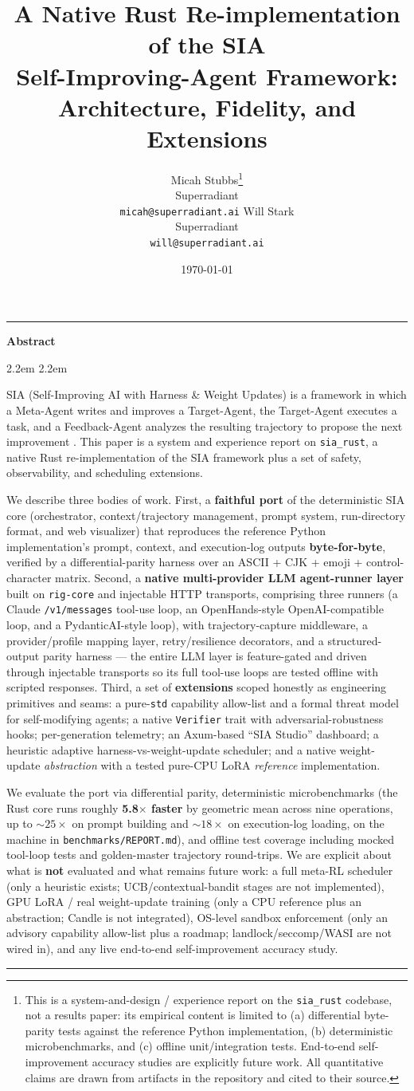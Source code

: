 \documentclass{article}
\title{A Native Rust Re-implementation of the SIA\\ Self-Improving-Agent Framework:\\ Architecture, Fidelity, and Extensions}
\author{%
  Micah Stubbs\thanks{This is a
  system-and-design / experience report on the \texttt{sia\_rust} codebase, not a
  results paper: its empirical content is limited to (a) differential byte-parity
  tests against the reference Python implementation, (b) deterministic
  microbenchmarks, and (c) offline unit/integration tests. End-to-end
  self-improvement accuracy studies are explicitly future work. All quantitative
  claims are drawn from artifacts in the repository and cited to their source.}\\
  Superradiant\\
  \texttt{micah@superradiant.ai}
  \And
  Will Stark\\
  Superradiant\\
  \texttt{will@superradiant.ai}
}
\date{\today}
\renewenvironment{abstract}{%
  \par\vskip 0.05in
  {\color{accent}\hrule height 1pt}\vskip 7pt
  \centerline{\large\bfseries\color{accent} Abstract}\vskip 6pt
  \begingroup\leftskip 2.2em \rightskip 2.2em
}{%
  \par\endgroup\vskip 6pt {\color{accent}\hrule height 1pt}\vskip 0.12in
}
\begin{document}
\begin{CJK}{UTF8}{gbsn}
\maketitle

\begin{abstract}
SIA (Self-Improving AI with Harness \& Weight Updates) is a framework in which a
Meta-Agent writes and improves a Target-Agent, the Target-Agent executes a task,
and a Feedback-Agent analyzes the resulting trajectory to propose the next
improvement \citep{hebbar2026sia}. This paper is a system and experience report on
\texttt{sia\_rust}, a native Rust re-implementation of the SIA framework plus a set
of safety, observability, and scheduling extensions.

We describe three bodies of work. First, a \textbf{faithful port} of the
deterministic SIA core (orchestrator, context/trajectory management, prompt system,
run-directory format, and web visualizer) that reproduces the reference Python
implementation's prompt, context, and execution-log outputs \textbf{byte-for-byte},
verified by a differential-parity harness over an ASCII + CJK + emoji +
control-character matrix. Second, a \textbf{native multi-provider LLM agent-runner
layer} built on \texttt{rig-core} and injectable HTTP transports, comprising three
runners (a Claude \texttt{/v1/messages} tool-use loop, an OpenHands-style
OpenAI-compatible loop, and a PydanticAI-style loop), with trajectory-capture
middleware, a provider/profile mapping layer, retry/resilience decorators, and a
structured-output parity harness --- the entire LLM layer is feature-gated and
driven through injectable transports so its full tool-use loops are tested offline
with scripted responses. Third, a set of \textbf{extensions} scoped honestly as
engineering primitives and seams: a pure-\texttt{std} capability allow-list and a
formal threat model for self-modifying agents; a native \texttt{Verifier} trait
with adversarial-robustness hooks; per-generation telemetry; an Axum-based ``SIA
Studio'' dashboard; a heuristic adaptive harness-vs-weight-update scheduler; and a
native weight-update \emph{abstraction} with a tested pure-CPU LoRA \emph{reference}
implementation.

We evaluate the port via differential parity, deterministic microbenchmarks (the
Rust core runs roughly \textbf{5.8$\times$ faster} by geometric mean across nine
operations, up to ${\sim}25\times$ on prompt building and ${\sim}18\times$ on
execution-log loading, on the machine in \texttt{benchmarks/REPORT.md}), and offline
test coverage including mocked tool-loop tests and golden-master trajectory
round-trips. We are explicit about what is \textbf{not} evaluated and what remains
future work: a full meta-RL scheduler (only a heuristic exists; UCB/contextual-bandit
stages are not implemented), GPU LoRA / real weight-update training (only a CPU
reference plus an abstraction; Candle is not integrated), OS-level sandbox
enforcement (only an advisory capability allow-list plus a roadmap;
landlock/seccomp/WASI are not wired in), and any live end-to-end self-improvement
accuracy study.
\end{abstract}


\end{CJK}
\end{document}
